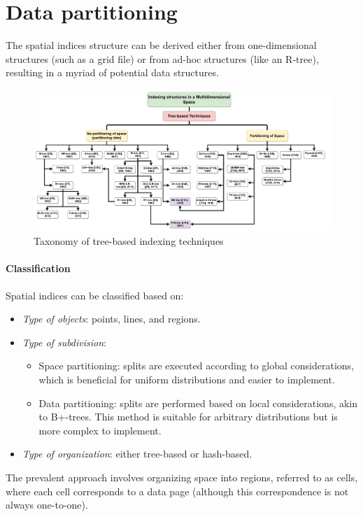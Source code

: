 \section{Data partitioning}

The spatial indices structure can be derived either from one-dimensional structures (such as a grid file) or from ad-hoc structures (like an R-tree), resulting in a myriad of potential data structures.
\begin{figure}[H]
    \centering
    \includegraphics[width=1\linewidth]{images/mult.png}
    \caption{Taxonomy of tree-based indexing techniques}
\end{figure}

\paragraph*{Classification}
Spatial indices can be classified based on:
\begin{itemize}
    \item \textit{Type of objects}: points, lines, and regions. 
    \item \textit{Type of subdivision}: 
        \begin{itemize}
            \item Space partitioning: splits are executed according to global considerations, which is beneficial for uniform distributions and easier to implement.
            \item Data partitioning: splits are performed based on local considerations, akin to B+-trees. 
                This method is suitable for arbitrary distributions but is more complex to implement.
        \end{itemize}
    \item \textit{Type of organization}: either tree-based or hash-based. 
\end{itemize}
The prevalent approach involves organizing space into regions, referred to as cells, where each cell corresponds to a data page (although this correspondence is not always one-to-one).

